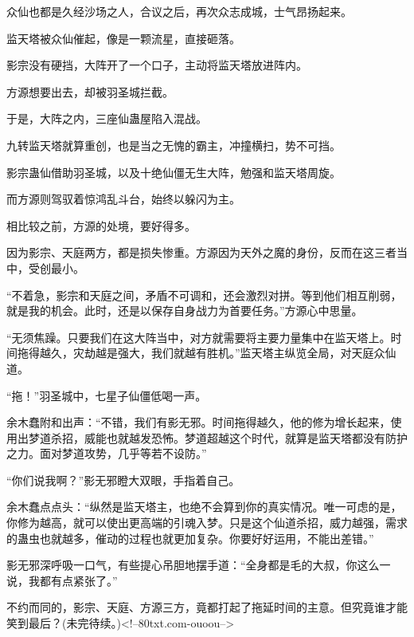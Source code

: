 \begin{this_body}
众仙也都是久经沙场之人，合议之后，再次众志成城，士气昂扬起来。

监天塔被众仙催起，像是一颗流星，直接砸落。

影宗没有硬挡，大阵开了一个口子，主动将监天塔放进阵内。

方源想要出去，却被羽圣城拦截。

于是，大阵之内，三座仙蛊屋陷入混战。

九转监天塔就算重创，也是当之无愧的霸主，冲撞横扫，势不可挡。

影宗蛊仙借助羽圣城，以及十绝仙僵无生大阵，勉强和监天塔周旋。

而方源则驾驭着惊鸿乱斗台，始终以躲闪为主。

相比较之前，方源的处境，要好得多。

因为影宗、天庭两方，都是损失惨重。方源因为天外之魔的身份，反而在这三者当中，受创最小。

“不着急，影宗和天庭之间，矛盾不可调和，还会激烈对拼。等到他们相互削弱，就是我的机会。此时，还是以保存自身战力为首要任务。”方源心中思量。

“无须焦躁。只要我们在这大阵当中，对方就需要将主要力量集中在监天塔上。时间拖得越久，灾劫越是强大，我们就越有胜机。”监天塔主纵览全局，对天庭众仙道。

“拖！”羽圣城中，七星子仙僵低喝一声。

余木蠢附和出声：“不错，我们有影无邪。时间拖得越久，他的修为增长起来，使用出梦道杀招，威能也就越发恐怖。梦道超越这个时代，就算是监天塔都没有防护之力。面对梦道攻势，几乎等若不设防。”

“你们说我啊？”影无邪瞪大双眼，手指着自己。

余木蠢点点头：“纵然是监天塔主，也绝不会算到你的真实情况。唯一可虑的是，你修为越高，就可以使出更高端的引魂入梦。只是这个仙道杀招，威力越强，需求的蛊虫也就越多，催动的过程也就更加复杂。你要好好运用，不能出差错。”

影无邪深呼吸一口气，有些提心吊胆地摆手道：“全身都是毛的大叔，你这么一说，我都有点紧张了。”

不约而同的，影宗、天庭、方源三方，竟都打起了拖延时间的主意。但究竟谁才能笑到最后？(未完待续。)<!--80txt.com-ouoou-->

\end{this_body}

